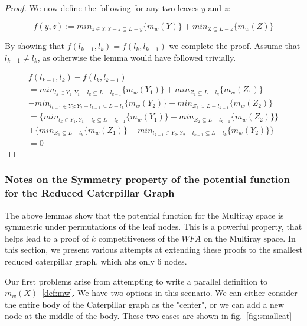 \begin{proof}
    We now define the following for any two leaves $y$ and $z$: 

    \begin{equation*}
        f(y, z) := min_{z \in Y : Y - z \subseteq L-y} \{ m_w(Y)\} + min_{Z \subseteq L-z} \{ m_w(Z)\}
    \end{equation*}

    By showing that $f(l_{k-1}, l_k) = f(l_k, l_{k-1})$ we complete the proof.
    Assume that $l_{k-1} \neq l_k$, as otherwise the lemma would have followed trivially. 

    \begin{equation*}
        \begin{gathered}
        f(l_{k-1}, l_k) - f(l_k, l_{k-1})\\
        = min_{l_k \in Y_1 : Y_1 - l_k \subseteq L - l_{k-1}} \{ m_w(Y_1)\} + min_{Z_1 \subseteq L - l_k} \{ m_w(Z_1)\} \\
        - min_{l_{k-1} \in Y_2 : Y_2 - l_{k-1} \subseteq L - l_k} \{ m_w(Y_2)\} - min_{Z_2 \subseteq L - l_{k-1}} \{ m_w(Z_2)\} \\
        = \{ min_{l_k \in Y_1 : Y_1 - l_k \subseteq L - l_{k-1}} \{ m_w(Y_1)\} - min_{Z_2 \subseteq L - l_{k-1}} \{ m_w(Z_2)\}\}\\
        + \{min_{Z_1 \subseteq L - l_k} \{ m_w(Z_1)\} - min_{l_{k-1} \in Y_2 : Y_2 - l_{k-1} \subseteq L - l_k} \{ m_w(Y_2)\}\} \\ 
        = 0
        \end{gathered}
    \end{equation*}
\end{proof}

\subsubsection*{Notes on the Symmetry property of the potential function for the Reduced Caterpillar Graph}

The above lemmas show that the potential function for the Multiray space is symmetric under permutations of the leaf nodes. This is a powerful property, that helps lead to a proof of $k$ competitiveness of the $WFA$ on the Multiray space. In this section, we present various attempts at extending these proofs to the smallest reduced caterpillar graph, which ahs only 6 nodes.

Our first problems arise from attempting to write a parallel definition to $m_w(X)$~\ref{def:mw}. We have two options in this scenario. We can either consider the entire body of the Caterpillar graph as the "center", or we can add a new node at the middle of the body. These two cases are shown in fig.~\ref{fig:smallcat}

